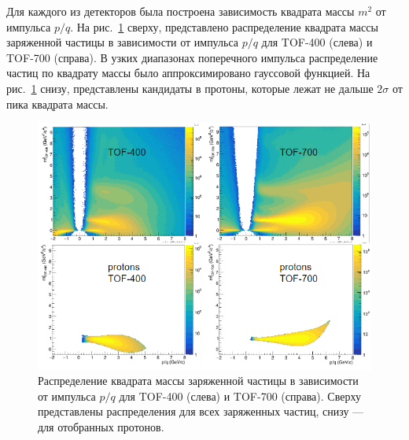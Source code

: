 Для каждого из детекторов была построена зависимость квадрата массы $m^2$ от импульса $p/q$. 
На рис.~\ref{fig:bmn_m2_pq} сверху, представлено распределение квадрата массы заряженной частицы в зависимости от импульса $p/q$ для TOF-400 (слева) и TOF-700 (справа).
В узких диапазонах поперечного импульса распределение частиц по квадрату массы было аппроксимировано гауссовой функцией. 
На рис.~\ref{fig:bmn_m2_pq} снизу, представлены кандидаты в протоны, которые лежат не дальше $2\sigma$ от пика квадрата массы.
%
\begin{figure}[ht]
\begin{center}
\includegraphics[width=0.95\linewidth]{images/bmn_m2_pq.png}
\caption{Распределение квадрата массы заряженной частицы в зависимости от импульса $p/q$ для TOF-400 (слева) и TOF-700 (справа). Сверху представлены распределения для всех заряженных частиц, снизу --- для отобранных протонов.}
\label{fig:bmn_m2_pq}
\end{center}
\end{figure}


